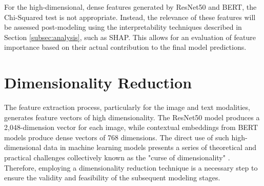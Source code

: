 For the high-dimensional, dense features generated by ResNet50 and BERT, the Chi-Squared test is not appropriate. Instead, the relevance of these features will be assessed post-modeling using the interpretability techniques described in Section \ref{subsec:analysis}, such as SHAP. This allows for an evaluation of feature importance based on their actual contribution to the final model predictions.

\section{Dimensionality Reduction}
\label{sec:rationale_pca}
The feature extraction process, particularly for the image and text modalities, generates feature vectors of high dimensionality. The ResNet50 model produces a 2,048-dimension vector for each image, while contextual embeddings from BERT models produce dense vectors of 768 dimensions. The direct use of such high-dimensional data in machine learning models presents a series of theoretical and practical challenges collectively known as the "curse of dimensionality" \citep{bellman1961, bellman1966}. Therefore, employing a dimensionality reduction technique is a necessary step to ensure the validity and feasibility of the subsequent modeling stages.

